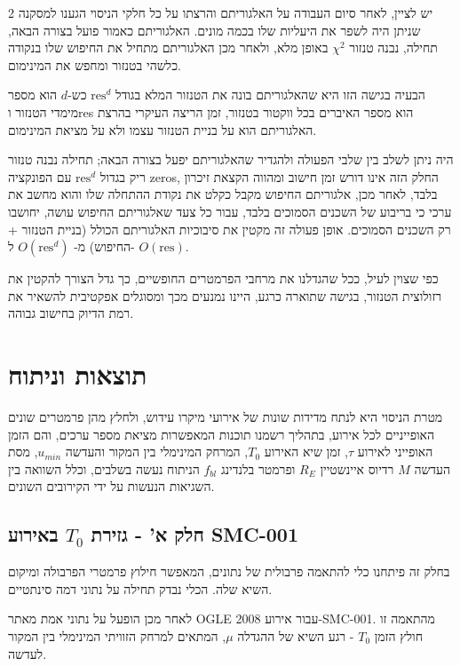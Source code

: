 \documentclass{article}
\begin{document}
\begin{multicols}{2}
יש לציין, לאחר סיום העבודה על האלגוריתם והרצתו על כל חלקי הניסוי 
הגענו למסקנה שניתן היה לשפר את היעליות שלו בכמה מונים.
האלגוריתם כאמור פועל בצורה הבאה, תחילה, נבנה טנזור 
$\chi^2$
באופן מלא, ולאחר מכן האלגוריתם מתחיל את החיפוש שלו בנקודה כלשהי בטנזור ומחפש את המינימום.

הבעיה בגישה הזו היא שהאלגוריתם בונה את הטנזור המלא בגודל 
$\text{res}^d$
כש-$d$
הוא מספר מימדי הטנזור ו\textenglish{res}
הוא מספר האיברים בכל ווקטור בטנזור,
זמן הריצה העיקרי בהרצת האלגוריתם הוא על בניית הטנזור עצמו ולא על מציאת המינימום.

היה ניתן לשלב בין שלבי הפעולה ולהגדיר שהאלגוריתם יפעל בצורה הבאה;
תחילה נבנה טנזור ריק בגדול
$\text{res}^d$
עם הפונקציה 
\textenglish{zeros},
החלק הזה אינו דורש זמן חישוב ומהווה הקצאת זיכרון בלבד,
לאחר מכן, אלגוריתם החיפוש מקבל כקלט את נקודת ההתחלה שלו והוא מחשב את ערכי כי בריבוע של השכנים הסמוכים בלבד,
עבור כל צעד שאלגוריתם החיפוש עושה, יחושבו רק השכנים הסמוכים.
אופן פעולה זה מקטין את סיבוכיות האלגוריתם הכולל (בניית הטנזור + החיפוש) מ-
$O(\text{res}^d)$
ל-
$O(\text{res})$.

כפי שצוין לעיל, ככל שהגדלנו את מרחבי הפרמטרים החופשיים, כך גדל הצורך להקטין את רזולוצית הטנזור, בגישה שתוארה כרגע, היינו נמנעים מכך ומסוגלים אפקטיבית להשאיר את רמת הדיוק בחישוב גבוהה.



\section{תוצאות וניתוח}

מטרת הניסוי היא לנתח מדידות שונות של אירועי מיקרו עידוש, ולחלץ מהן פרמטרים שונים האופייניים לכל אירוע, בתהליך רשמנו תוכנות המאפשרות מציאת מספר ערכים, והם הזמן האופייני לאירוע $\tau$, זמן שיא האירוע 
$T_0$,
המרחק המינימלי בין המקור והעדשה 
$u_{min}$, 
מסת העדשה 
$M$
רדיוס איינשטיין
$R_E$
ופרמטר בלנדינג 
$f_{bl}$
הניתוח נעשה בשלבים, וכלל השוואה בין השגיאות הנעשות על ידי הקירובים השונים.

\subsection{חלק א' - גזירת $T_0$ באירוע \textenglish{SMC-001}}

בחלק זה פיתחנו כלי להתאמה פרבולית של נתונים, המאפשר חילוץ פרמטרי הפרבולה ומיקום השיא שלה. הכלי נבדק תחילה על נתוני דמה סינתטיים. 

לאחר מכן הופעל על נתוני אמת מאתר 
\textenglish{OGLE} 
\cite{ogle_general_data}
עבור אירוע 
\textenglish{2008-SMC-001}.
מהתאמה זו חולץ הזמן 
$T_0$
- רגע השיא של ההגדלה 
$\mu$, 
המתאים למרחק הזוויתי המינימלי בין המקור לעדשה.


\end{multicols}
\end{document}
